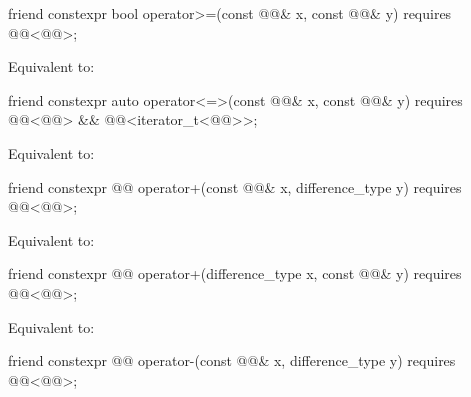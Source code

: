 %
\begin{itemdecl}
friend constexpr bool operator>=(const @@& x, const @@& y)
  requires @@<@@>;
\end{itemdecl}

\begin{itemdescr}
\pnum
\effects
Equivalent to: 
\end{itemdescr}

%
\begin{itemdecl}
friend constexpr auto operator<=>(const @@& x, const @@& y)
  requires @@<@@> && @@<iterator_t<@@>>;
\end{itemdecl}

\begin{itemdescr}
\pnum
\effects
Equivalent to: 
\end{itemdescr}

%
\begin{itemdecl}
friend constexpr @@ operator+(const @@& x, difference_type y)
  requires @@<@@>;
\end{itemdecl}

\begin{itemdescr}
\pnum
\effects
Equivalent to: 
\end{itemdescr}

%
\begin{itemdecl}
friend constexpr @@ operator+(difference_type x, const @@& y)
  requires @@<@@>;
\end{itemdecl}

\begin{itemdescr}
\pnum
\effects
Equivalent to: 
\end{itemdescr}

%
\begin{itemdecl}
friend constexpr @@ operator-(const @@& x, difference_type y)
  requires @@<@@>;
\end{itemdecl}

